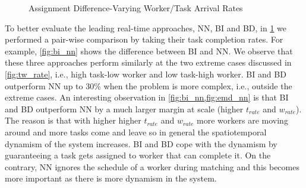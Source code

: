 \begin{figure}[h]
	\centering
    \vspace{-0.15in}
	\caption{\small{Assignment Difference-Varying Worker/Task Arrival Rates}}\label{fig:rate_comp}
\end{figure}

To better evaluate the leading real-time approaches, NN, BI and BD, in \cref{fig:rate_comp} we performed a pair-wise comparison by taking their task completion rates. For example, \cref{fig:bi_nn} shows the difference between BI and NN. We observe that these three approaches perform similarly at the two extreme cases discussed in \cref{fig:tw_rate}, i.e., high task-low worker and low task-high worker. BI and BD outperform NN up to 30\% when the problem is more complex, i.e., outside the extreme cases. An interesting observation in \cref{fig:bi_nn,fig:emd_nn} is that BI and BD outperform NN by a much larger margin at scale (higher $t_{rate}$ and $w_{rate}$). The reason is that with higher higher $t_{rate}$ and $w_{rate}$ more workers are moving around and more tasks come and leave so in general the spatiotemporal dynamism of the system increases. BI and BD cope with the dynamism by guaranteeing a task gets assigned to worker that can complete it. On the contrary, NN ignores the schedule of a worker during matching and this becomes more important as there is more dynamism in the system.


